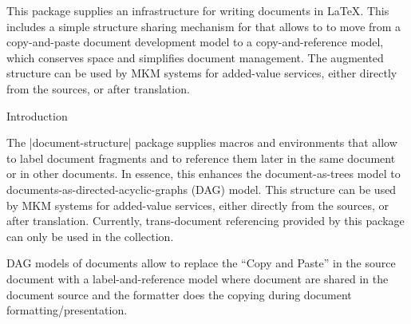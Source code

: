 This package supplies an infrastructure for writing {\omdoc} documents in {\LaTeX}.
This includes a simple structure sharing mechanism for \sTeX that allows to to move from
a copy-and-paste document development model to a copy-and-reference model, which
conserves space and simplifies document management. The augmented structure can be used
by MKM systems for added-value services, either directly from the \sTeX sources, or
after translation.

\begin{sfragment}[id=sec:STR]{Introduction}

 The |document-structure| package supplies macros and environments that allow to label document
 fragments and to reference them later in the same document or in other documents. In
 essence, this enhances the document-as-trees model to
 documents-as-directed-acyclic-graphs (DAG) model. This structure can be used by MKM
 systems for added-value services, either directly from the \sTeX sources, or after
 translation. Currently, trans-document referencing provided by this package can only be
 used in the \sTeX collection.

 DAG models of documents allow to replace the ``Copy and Paste'' in the source document
 with a label-and-reference model where document are shared in the document source and the
 formatter does the copying during document formatting/presentation.
\end{sfragment}

